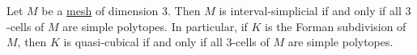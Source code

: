 \begin{proposition}
  Let $M$ be a \hyperref[cmc:mesh:definition]{mesh} of dimension $3$.
  Then $M$ is interval-simplicial if and only if all $3$-cells of $M$
  are simple polytopes.
  In particular, if $K$ is the Forman subdivision of $M$,
  then $K$ is quasi-cubical if and only if all $3$-cells of $M$
  are simple polytopes.
\end{proposition}
